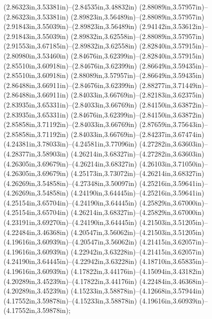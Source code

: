 (2.86323in,3.53381in)--(2.84535in,3.48832in) (2.88089in,3.57957in)--(2.86323in,3.53381in) (2.89823in,3.56489in)--(2.88089in,3.57957in) (2.91843in,3.55039in)--(2.89823in,3.56489in) (2.94142in,3.53612in)--(2.91843in,3.55039in) (2.89832in,3.62558in)--(2.88089in,3.57957in) (2.91553in,3.67185in)--(2.89832in,3.62558in) (2.82840in,3.57915in)--(2.80980in,3.53460in) (2.84676in,3.62399in)--(2.82840in,3.57915in) (2.85510in,3.60918in)--(2.84676in,3.62399in) (2.86649in,3.59435in)--(2.85510in,3.60918in) (2.88089in,3.57957in)--(2.86649in,3.59435in) (2.86488in,3.66911in)--(2.84676in,3.62399in) (2.88277in,3.71449in)--(2.86488in,3.66911in) (2.84033in,3.66769in)--(2.82183in,3.62375in) (2.83935in,3.65331in)--(2.84033in,3.66769in) (2.84150in,3.63872in)--(2.83935in,3.65331in) (2.84676in,3.62399in)--(2.84150in,3.63872in) (2.85858in,3.71192in)--(2.84033in,3.66769in) (2.87659in,3.75643in)--(2.85858in,3.71192in) (2.84033in,3.66769in)--(2.84237in,3.67474in) (4.24381in,3.78033in)--(4.24581in,3.77096in) (4.27282in,3.63603in)--(4.28377in,3.58903in) (4.26214in,3.68327in)--(4.27282in,3.63603in) (4.26305in,3.69679in)--(4.26214in,3.68327in) (4.26103in,3.71050in)--(4.26305in,3.69679in) (4.25173in,3.73072in)--(4.26214in,3.68327in) (4.26269in,3.54858in)--(4.27348in,3.50097in) (4.25216in,3.59641in)--(4.26269in,3.54858in) (4.24190in,3.64445in)--(4.25216in,3.59641in) (4.25154in,3.65704in)--(4.24190in,3.64445in) (4.25829in,3.67000in)--(4.25154in,3.65704in) (4.26214in,3.68327in)--(4.25829in,3.67000in) (4.23191in,3.69270in)--(4.24190in,3.64445in) (4.21503in,3.51205in)--(4.22484in,3.46368in) (4.20547in,3.56062in)--(4.21503in,3.51205in) (4.19616in,3.60939in)--(4.20547in,3.56062in) (4.21415in,3.62057in)--(4.19616in,3.60939in) (4.22942in,3.63228in)--(4.21415in,3.62057in) (4.24190in,3.64445in)--(4.22942in,3.63228in) (4.18710in,3.65835in)--(4.19616in,3.60939in) (4.17822in,3.44176in)--(4.15094in,3.43182in) (4.20289in,3.45239in)--(4.17822in,3.44176in) (4.22484in,3.46368in)--(4.20289in,3.45239in) (4.15233in,3.58878in)--(4.12668in,3.57944in) (4.17552in,3.59878in)--(4.15233in,3.58878in) (4.19616in,3.60939in)--(4.17552in,3.59878in);
